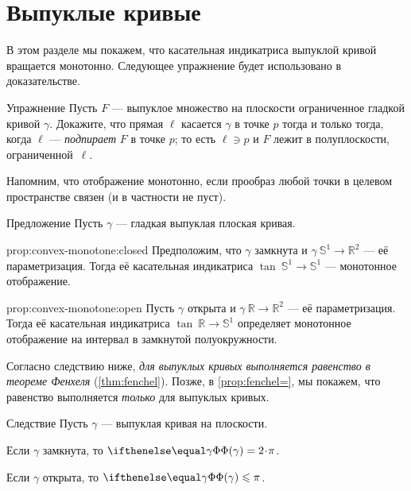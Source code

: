 \section{Выпуклые кривые}

В этом разделе мы покажем, что касательная индикатриса выпуклой кривой вращается монотонно.
Следующее упражнение будет использовано в доказательстве.

\begin{thm}{Упражнение}\label{ex:tangent-support}
Пусть $F$ --- выпуклое множество на плоскости ограниченное гладкой кривой $\gamma$.
Докажите, что прямая $\ell$ касается $\gamma$ в точке $p$ тогда и только тогда, когда $\ell$ --- \emph{подпирает} $F$ в точке $p$;
то есть $\ell\ni p$ и $F$ лежит в полуплоскости, ограниченной~$\ell$.
\end{thm}

Напомним, что отображение монотонно, если прообраз любой точки в целевом пространстве связен (и в частности не пуст).

\begin{thm}{Предложение}\label{prop:convex-monotone}
Пусть $\gamma$ --- гладкая выпуклая плоская кривая.

\begin{subthm}{prop:convex-monotone:closed}
Предположим, что $\gamma$ замкнута и $\gamma\:\mathbb{S}^1\to \mathbb{R}^2$ --- её параметризация.
Тогда её касательная индикатриса $\tan\:\mathbb{S}^1\to \mathbb{S}^1$ --- монотонное отображение.
\end{subthm}

\begin{subthm}{prop:convex-monotone:open}
Пусть $\gamma$ открыта и $\gamma\:\mathbb{R}\to \mathbb{R}^2$ --- её параметризация.
Тогда её касательная индикатриса $\tan\:\mathbb{R}\to\mathbb{S}^1$ определяет монотонное отображение на интервал в замкнутой полуокружности.
\end{subthm}

\end{thm}

Согласно следствию ниже, \textit{для выпуклых кривых выполняется равенство в теореме Фенхеля} (\ref{thm:fenchel}).
Позже, в \ref{prop:fenchel=}, мы покажем, что равенство выполняется \textit{только} для выпуклых кривых.

\begin{thm}{Следствие}\label{cor:fenchel=convex}
Пусть $\gamma$ --- выпуклая кривая на плоскости.

\begin{subthm}{}
Если $\gamma$ замкнута, то $\tc\gamma=2\cdot\pi$.
\end{subthm}

\begin{subthm}{}
Если $\gamma$ открыта, то $\tc\gamma\le\pi$.
\end{subthm}

\end{thm}


